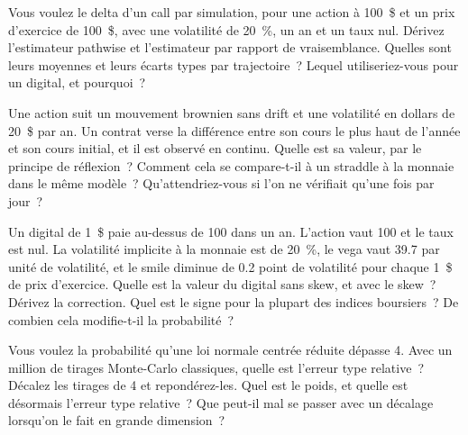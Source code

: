 \begin{question}\label{iq:iv2:pricing-and-numerics:40}
Vous voulez le delta d'un call par simulation, pour une action à 100~\$ et un prix d'exercice de 100~\$, avec une volatilité de 20~\%, un an et un taux nul. Dérivez l'estimateur pathwise et l'estimateur par rapport de vraisemblance. Quelles sont leurs moyennes et leurs écarts types par trajectoire~? Lequel utiliseriez-vous pour un digital, et pourquoi~?
\end{question}

\begin{question}\label{iq:iv2:pricing-and-numerics:41}
Une action suit un mouvement brownien sans drift et une volatilité en dollars de 20~\$ par an. Un contrat verse la différence entre son cours le plus haut de l'année et son cours initial, et il est observé en continu. Quelle est sa valeur, par le principe de réflexion~? Comment cela se compare-t-il à un straddle à la monnaie dans le même modèle~? Qu'attendriez-vous si l'on ne vérifiait qu'une fois par jour~?
\end{question}

\begin{question}\label{iq:iv2:pricing-and-numerics:42}
Un digital de 1~\$ paie au-dessus de 100 dans un an. L'action vaut 100 et le taux est nul. La volatilité implicite à la monnaie est de 20~\%, le vega vaut 39.7 par unité de volatilité, et le smile diminue de 0.2 point de volatilité pour chaque 1~\$ de prix d'exercice. Quelle est la valeur du digital sans skew, et avec le skew~? Dérivez la correction. Quel est le signe pour la plupart des indices boursiers~? De combien cela modifie-t-il la probabilité~?
\end{question}

\begin{question}\label{iq:iv2:pricing-and-numerics:43}
Vous voulez la probabilité qu'une loi normale centrée réduite dépasse 4. Avec un million de tirages Monte-Carlo classiques, quelle est l'erreur type relative~? Décalez les tirages de 4 et repondérez-les. Quel est le poids, et quelle est désormais l'erreur type relative~? Que peut-il mal se passer avec un décalage lorsqu'on le fait en grande dimension~?
\end{question}

